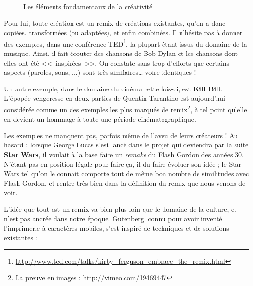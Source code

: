 \begin{figure}[H]
\caption{Les éléments fondamentaux de la créativité}
\end{figure}

Pour lui, toute création est un remix de créations existantes, qu'on a donc copiées, transformées (ou adaptées), et enfin combinées.
Il n'hésite pas à donner des exemples, dans une conférence TED\footnote{\url{http://www.ted.com/talks/kirby_ferguson_embrace_the_remix.html}}, la plupart étant issus du domaine de la musique.
Ainsi, il fait écouter des chansons de Bob Dylan et les chansons dont elles ont été <<~inspirées~>>.
On constate sans trop d'efforts que certains aspects (paroles, sons, ...) sont très similaires\dots{} voire identiques !

Un autre exemple, dans le domaine du cinéma cette fois-ci, est \textbf{Kill Bill}.
L'épopée vengeresse en deux parties de Quentin Tarantino est aujourd'hui considérée comme un des exemples les plus marqués de remix\footnote{La preuve en images : \url{http://vimeo.com/19469447}}, à tel point qu'elle en devient un hommage à toute une période cinématographique.

Les exemples ne manquent pas, parfois même de l'aveu de leurs créateurs !
Au hasard : lorsque George Lucas s'est lancé dans le projet qui deviendra par la suite \textbf{Star Wars}, il voulait à la base faire un \textit{remake} du Flash Gordon des années 30.
N'étant pas en position légale pour faire ça, il du faire évoluer son idée ; le Star Wars tel qu'on le connait comporte tout de même bon nombre de similitudes avec Flash Gordon, et rentre très bien dans la définition du remix que nous venons de voir.

L'idée que tout est un remix va bien plus loin que le domaine de la culture, et n'est pas ancrée dans notre époque. Gutenberg, connu pour avoir inventé l'imprimerie à caractères mobiles, s'est inspiré de techniques et de solutions existantes :

